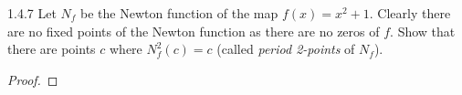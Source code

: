 \begin{problem}{1.4.7}
  Let $N_f$ be the Newton function of the map $f(x) = x^2 + 1$. Clearly there are no
  fixed points of the Newton function as there are no zeros of $f$. Show that there are
  points $c$ where $N_f^2 (c) = c$ (called \emph{period 2-points} of $N_f$).
\end{problem}

\begin{proof}
\end{proof}
\newpage
